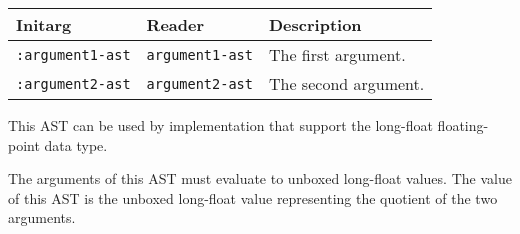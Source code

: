 \begin{tabular}{|l|l|l|}
\hline
Initarg & Reader & Description\\
\hline\hline
\texttt{:argument1-ast} & \texttt{argument1-ast} & The first argument.\\
\hline
\texttt{:argument2-ast} & \texttt{argument2-ast} & The second argument.\\
\hline
\end{tabular}

This AST can be used by implementation that support the long-float
floating-point data type.  

The arguments of this AST must evaluate to unboxed long-float
values.  The value of this AST is the unboxed long-float value
representing the quotient of the two arguments.
